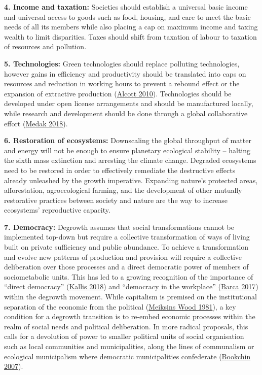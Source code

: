 \documentclass[a4paper, nobind]{templates/ociamthesis}
\begin{document}
\textbf{4. Income and taxation:} Societies should establish a universal basic income and universal access to goods such as food, housing, and care to meet the basic needs of all its members while also placing a cap on maximum income and taxing wealth to limit disparities. Taxes should shift from taxation of labour to taxation of resources and pollution.

\textbf{5. Technologies:} Green technologies should replace polluting technologies, however gains in efficiency and productivity should be translated into caps on resources and reduction in working hours to prevent a rebound effect or the expansion of extractive production (\protect\hyperlink{ref-alcott_impact_2010}{Alcott 2010}). Technologies should be developed under open license arrangements and should be manufactured locally, while research and development should be done through a global collaborative effort (\protect\hyperlink{ref-medak_technologies_2018}{Medak 2018}).

\textbf{6. Restoration of ecosystems:} Downscaling the global throughput of matter and energy will not be enough to ensure planetary ecological stability -- halting the sixth mass extinction and arresting the climate change. Degraded ecosystems need to be restored in order to effectively remediate the destructive effects already unleashed by the growth imperative. Expanding nature's protected areas, afforestation, agroecological farming, and the development of other mutually restorative practices between society and nature are the way to increase ecosystems' reproductive capacity.

\textbf{7. Democracy:} Degrowth assumes that social transformations cannot be implemented top-down but require a collective transformation of ways of living built on private sufficiency and public abundance. To achieve a transformation and evolve new patterns of production and provision will require a collective deliberation over those processes and a direct democratic power of members of sociometabolic units. This has led to a growing recognition of the importance of ``direct democracy'' (\protect\hyperlink{ref-kallis_degrowth_2018}{Kallis 2018}) and ``democracy in the workplace'' (\protect\hyperlink{ref-barca_labors_2017}{Barca 2017}) within the degrowth movement. While capitalism is premised on the institutional separation of the economic from the political (\protect\hyperlink{ref-meiksins_wood_separation_1981}{Meiksins Wood 1981}), a key condition for a degrowth transition is to re-embed economic processes within the realm of social needs and political deliberation. In more radical proposals, this calls for a devolution of power to smaller political units of social organisation such as local communities and municipalities, along the lines of communalism or ecological municipalism where democratic municipalities confederate (\protect\hyperlink{ref-bookchin_social_2007}{Bookchin 2007}).
\end{document}
